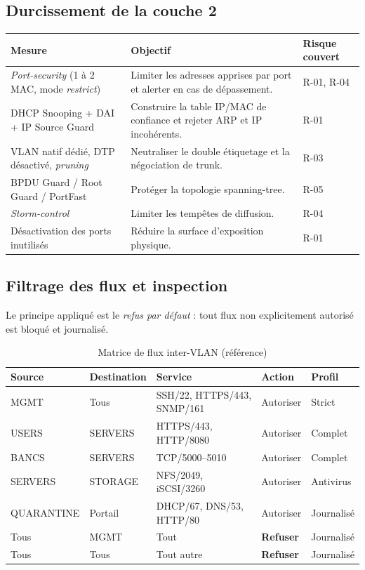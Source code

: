 \documentclass[11pt,a4paper]{article}
\begin{document}
\subsection{Durcissement de la couche 2}
\begin{table}[H]
\centering
\begin{tabularx}{\textwidth}{L{4.6cm} Y C{2.0cm}}
\toprule
{}\textbf{Mesure} & \textbf{Objectif} & \textbf{Risque couvert} \\
\midrule
\textit{Port-security} (1 à 2 MAC, mode \textit{restrict}) & Limiter les adresses apprises par port et alerter en cas de dépassement. & R-01, R-04 \\
DHCP Snooping + DAI + IP Source Guard & Construire la table IP/MAC de confiance et rejeter ARP et IP incohérents. & R-01 \\
VLAN natif dédié, DTP désactivé, \textit{pruning} & Neutraliser le double étiquetage et la négociation de trunk. & R-03 \\
BPDU Guard / Root Guard / PortFast & Protéger la topologie spanning-tree. & R-05 \\
\textit{Storm-control} & Limiter les tempêtes de diffusion. & R-04 \\
Désactivation des ports inutilisés & Réduire la surface d'exposition physique. & R-01 \\
\bottomrule
\end{tabularx}
\end{table}

\subsection{Filtrage des flux et inspection}
Le principe appliqué est le \emph{refus par défaut} : tout flux non explicitement autorisé est bloqué et journalisé.

\begin{table}[H]
\centering
\caption{Matrice de flux inter-VLAN (référence)}
\begin{tabularx}{\textwidth}{L{2.6cm} L{2.1cm} L{3.4cm} C{1.7cm} Y}
\toprule
{}\textbf{Source} & \textbf{Destination} & \textbf{Service} & \textbf{Action} & \textbf{Profil} \\
\midrule
MGMT & Tous & SSH/22, HTTPS/443, SNMP/161 & Autoriser & Strict \\
USERS & SERVERS & HTTPS/443, HTTP/8080 & Autoriser & Complet \\
BANCS & SERVERS & TCP/5000--5010 & Autoriser & Complet \\
SERVERS & STORAGE & NFS/2049, iSCSI/3260 & Autoriser & Antivirus \\
QUARANTINE & Portail & DHCP/67, DNS/53, HTTP/80 & Autoriser & Journalisé \\
Tous & MGMT & Tout & \textbf{Refuser} & Journalisé \\
Tous & Tous & Tout autre & \textbf{Refuser} & Journalisé \\
\bottomrule
\end{tabularx}
\end{table}
\end{document}
